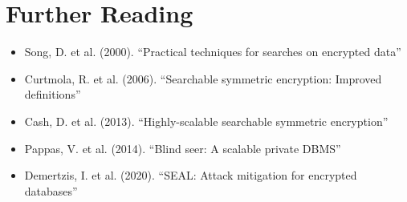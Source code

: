 \section{Further Reading}

\begin{itemize}
\item Song, D. et al. (2000). ``Practical techniques for searches on encrypted data''
\item Curtmola, R. et al. (2006). ``Searchable symmetric encryption: Improved definitions''
\item Cash, D. et al. (2013). ``Highly-scalable searchable symmetric encryption''
\item Pappas, V. et al. (2014). ``Blind seer: A scalable private DBMS''
\item Demertzis, I. et al. (2020). ``SEAL: Attack mitigation for encrypted databases''
\end{itemize}